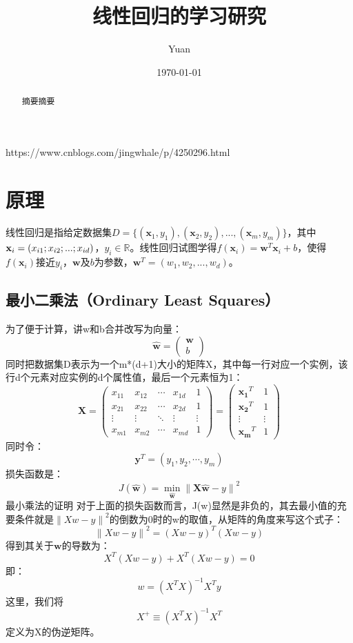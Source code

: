 \documentclass[12pt,a4paper,draft]{ctexart}
\title{线性回归的学习研究}
\author{Yuan}
\date{\today}
\begin{document}
\maketitle
\begin{abstract}
摘要摘要
\end{abstract}	
https://www.cnblogs.com/jingwhale/p/4250296.html
\section{原理}
线性回归是指给定数据集$ D=\{(\mathbf{x}_{1},y_{1}),(\mathbf{x}_{2},y_{2}),...,(\mathbf{x}_{m},y_{m})\} $，其中$\mathbf{x}_i=(x_{i1};x_{i2};\\...;x_{id})$，$y_{i}\in\mathbb{R} $。线性回归试图学得$f(\mathbf{x}_{i})=\mathbf{w}^T\mathbf{x}_{i}+b$，使得$f(\mathbf{x}_{i})$接近$ y_{i}$，$\mathbf{w}$及$b$为参数，$\mathbf{w}^T=(w_1,w_2,...,w_d)$。
\subsection{最小二乘法（Ordinary Least Squares）}
为了便于计算，讲w和b合并改写为向量：
\[ \hat{\mathbf{w}}=\begin{pmatrix}
\mathbf{w} \\ 
b
\end{pmatrix}  \]
同时把数据集D表示为一个m*(d+1)大小的矩阵X，其中每一行对应一个实例，该行d个元素对应实例的d个属性值，最后一个元素恒为1：
\[ 
\mathbf{X}=
\begin{pmatrix}
	x_{11} & x_{12} & \cdots & x_{1d} & 1 \\ 
	x_{21} & x_{22} & \cdots & x_{2d} & 1 \\ 
	\vdots & \vdots & \ddots & \vdots & \vdots \\ 
	x_{m1} & x_{m2} & \cdots & x_{md} & 1
\end{pmatrix} =\begin{pmatrix}
\mathbf{x_1}^T & 1 \\ 
\mathbf{x_2}^T & 1 \\ 
\vdots & \vdots \\ 
\mathbf{x_m}^T & 1
\end{pmatrix} 
\]
同时令：
\[ \mathbf{y}^T=(y_1,y_2,\cdots,y_m) \]
损失函数是： 
\[ J(\mathbf{\hat{w}})=\min_{\mathbf{\hat{w}}}\left \| \mathbf{X}\mathbf{\hat{w}}-y \right \|^{2} \]
最小乘法的证明
对于上面的损失函数而言，J(w)显然是非负的，其去最小值的充要条件就是$ \left \| Xw-y \right \|^{2} $的倒数为0时的w的取值，从矩阵的角度来写这个式子： 
\[ \left \| Xw-y \right \|^{2}=(Xw-y)^T(Xw-y) \]
得到其关于$ \mathbf{w} $的导数为： 
\[ X^T(Xw-y) + X^T(Xw-y)=0 \]
即： 
\[ w=(X^TX)^{-1}X^Ty \]
这里，我们将\[ X^+\equiv(X^TX)^{-1}X^T \]定义为X的伪逆矩阵。
\end{document}
